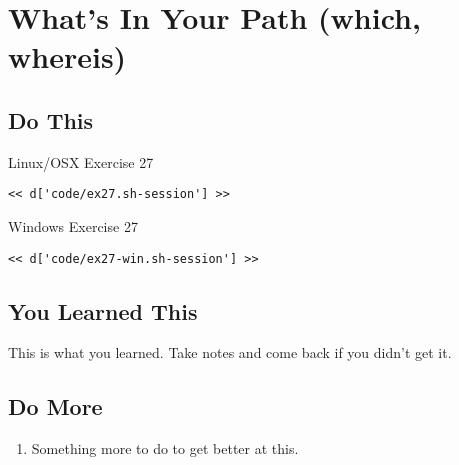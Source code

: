 \chapter{What's In Your Path (which, whereis)}

\section{Do This}

\begin{code}{Linux/OSX Exercise 27}
\begin{Verbatim}
<< d['code/ex27.sh-session'] >>
\end{Verbatim}
\end{code}

\begin{code}{Windows Exercise 27}
\begin{Verbatim}
<< d['code/ex27-win.sh-session'] >>
\end{Verbatim}
\end{code}

\section{You Learned This}

This is what you learned.  Take notes and come back if you didn't get it.

\section{Do More}

\begin{enumerate}
\item Something more to do to get better at this.
\end{enumerate}

